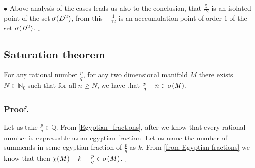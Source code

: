 $\bullet$ Above analysis of the cases leads us also to the conclusion, that $\frac{5}{12}$ 
is 
an isolated point of the set ${{\sigma}(D^2)}$, from this $-\frac{1}{12}$ is an acccumulation point 
of order $1$ of the set ${{\sigma}(D^2)}$. $_\square$ 

\subsection{Saturation theorem}
\begin{theorem}\label{saturation theorem}
For any rational number $\frac{p}{q}$, for any two dimensional manifold $M$
there exists $N\in\mathbb{N}_0$ such that 
for all $n \geq N$, we have that $\frac{p}{q} - n \in {{\sigma}(M)}$.
\end{theorem}
\subsubsection{Proof.}
Let us take $\frac{p}{q} \in \mathbb{Q}$. 
From \ref{Egyptian_fractions}, after \cite{every number is expressible 
as an egyptian fraction} we know that every rational number is expressable as an egyptian 
fraction. Let us name the number of summends in some egyptian fraction of $\frac{p}{q}$ 
as $k$. From \ref{from Egyptian fractions} we know that then 
$\chi(M) - k + \frac{p}{q} \in {{\sigma}(M)}$.  $_\square$

